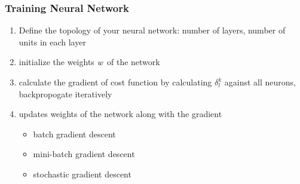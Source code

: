 \documentclass[notheorems, aspectratio=54]{beamer}
\begin{document}
\begin{frame}
\frametitle{Training Neural Network}
\begin{enumerate}
\item Define the topology of your neural network: number of layers, number of units in each layer
\item initialize the weights $\mathnormal{w}$ of the network
\item calculate the gradient of cost function by calculating $\delta^k_l$ against all neurons, backpropogate iteratively 
\item updates weights of the network along with the gradient
\begin{itemize}
\item batch gradient descent
\item mini-batch gradient descent
\item stochastic gradient descent
\end{itemize}
\end{enumerate}
\end{frame}
\end{document}
